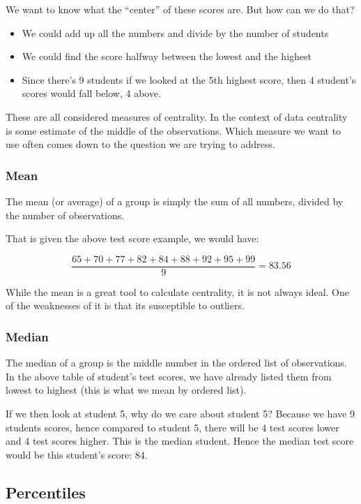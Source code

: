 \documentclass[
]{book}
\providecommand{\tightlist}{%
  \setlength{\itemsep}{0pt}\setlength{\parskip}{0pt}}
\begin{document}
We want to know what the ``center'' of these scores are. But how can we do that?

\begin{itemize}
\tightlist
\item
  We could add up all the numbers and divide by the number of students
\item
  We could find the score halfway between the lowest and the highest
\item
  Since there's 9 students if we looked at the 5th highest score, then 4 student's scores would fall below, 4 above.
\end{itemize}

These are all considered measures of centrality. In the context of data centrality is some estimate of the middle of the observations. Which measure we want to use often comes down to the question we are trying to address.

\hypertarget{mean}{%
\subsubsection{Mean}\label{mean}}

The mean (or average) of a group is simply the sum of all numbers, divided by the number of observations.

That is given the above test score example, we would have:

\[\frac{65+70+77+82+84+88+92+95+99}{9}=83.56\]

While the mean is a great tool to calculate centrality, it is not always ideal. One of the weaknesses of it is that its susceptible to outliers.

\hypertarget{median}{%
\subsubsection{Median}\label{median}}

The median of a group is the middle number in the ordered list of observations. In the above table of student's test scores, we have already listed them from lowest to highest (this is what we mean by ordered list).

If we then look at student 5, why do we care about student 5? Because we have 9 students scores, hence compared to student 5, there will be 4 test scores lower and 4 test scores higher. This is the median student. Hence the median test score would be this student's score: 84.

\hypertarget{percentiles}{%
\subsection{Percentiles}\label{percentiles}}
\end{document}
